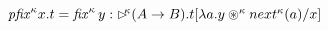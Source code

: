 \begin{prooftree}
\end{prooftree}
\begin{center}
$\mathit{pfix}^{\kappa}x.t = \mathit{fix}^{\kappa}\,y:\laterkappa(A\to
B).t[\lambda a.y\tensor^{\kappa}next^{\kappa}(a)/x]$
\end{center}
